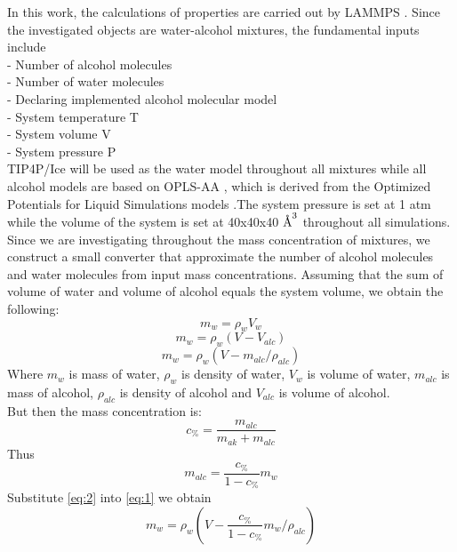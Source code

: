 In this work, the calculations of properties are carried out by LAMMPS \cite{plimpton_fast_1995}.
Since the investigated objects are water-alcohol mixtures, the fundamental inputs include\\
- Number of alcohol molecules\\
- Number of water molecules\\
- Declaring implemented alcohol molecular model\\
- System temperature T\\
- System volume V\\
- System pressure P\\
TIP4P/Ice \cite{abascal_potential_2005} will be used as the water model throughout all 
mixtures while all alcohol models are based on OPLS-AA \cite{jorgensen_development_1996}, 
which is derived from the Optimized Potentials for Liquid Simulations models 
\cite{jorgensen_opls_1988}.The system pressure is set at 1 atm while the volume of the 
system is set at 40x40x40 $\textup{\AA}^3$ throughout all simulations.\\
Since we are investigating throughout the mass concentration of mixtures, 
we construct a small converter that approximate the number of alcohol 
molecules and water molecules from input mass concentrations. Assuming 
that the sum of volume of water and volume of alcohol equals the system 
volume, we obtain the following:
\begin{equation}
    m_{w}=\rho_{w} V_{w}
\end{equation}
\begin{equation}
    m_{w}=\rho_{w}\left(V-V_{a l c}\right)
\end{equation}
\begin{equation}
    m_{w}=\rho_{w}\left(V-m_{a l c} / \rho_{a l c}\right) \label{eq:1}
\end{equation}
Where $m_w$ is mass of water, $\rho_w$ is density of water, $V_w$ is volume 
of water, $m_{alc}$ is mass of alcohol, $\rho_{alc}$ is density of alcohol and
$V_{alc}$ is volume of alcohol.\\
But then the mass concentration is:
\begin{equation}
    c_{\%}=\frac{m_{alc}}{m_{a k}+m_{alc}}
\end{equation}
Thus
\begin{equation}
    m_{alc}=\frac{c_{\%}}{1-c_{\%}}m_w  \label{eq:2}
\end{equation}
Substitute \ref{eq:2} into \ref{eq:1} we obtain
\begin{equation}
    m_{w}=\rho_{w}\left(V-\frac{c_{\%}}{1-c_{\%}} m_{w} / \rho_{a l c}\right)
\end{equation}
